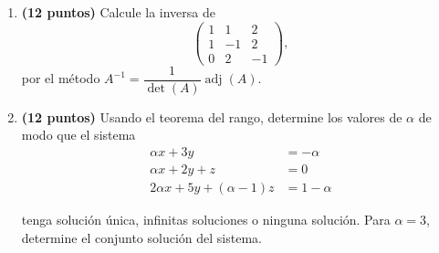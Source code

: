 \documentclass[a4paper]{article}
\begin{document}
\begin{enumerate}
\[\begin{vmatrix} 1 & x  & 3 & 0 \\ 1 & -1 & 0& 1\\ 0 & 0 & -1& -2\\ -x & -1 & 1 &  0  \end{vmatrix}=-9. \]
\newpage
    \item {\bf (12 puntos)} Calcule la inversa de
\[\begin{pmatrix} 1 & 1  & 2  \\ 1 & -1 & 2\\ 0 & 2 & -1 \end{pmatrix}, \]
por el m\'etodo $A^{-1}=\dfrac{1}{\det(A)}\operatorname{adj}(A)$.
\newpage
    \item {\bf (12 puntos)} Usando el teorema del rango, determine los valores de $\alpha$ de modo que el sistema
    \begin{align*}
\alpha x + 3y &= -\alpha \\
\alpha x + 2y +z &= 0\\
2\alpha x + 5y +(\alpha -1) z &= 1-\alpha 
\end{align*}

    tenga solución única, infinitas soluciones o ninguna solución. Para $\alpha=3$, determine el conjunto soluci\'on del sistema.
        
        









\end{enumerate}
\end{document}
